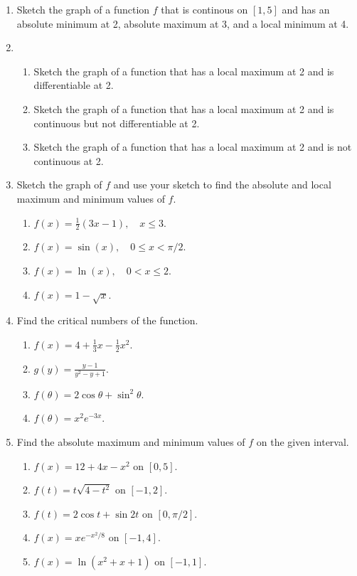 
\allhandoutinfo{}

\begin{enumerate}


	\item	Sketch the graph of a function $f$ that is continous on $[1,5]$ and has an absolute minimum at 2,
			absolute maximum at 3, and a local minimum at 4.

	\item 	\begin{enumerate}
			\item	Sketch the graph of a function that has a local maximum at 2 and is differentiable at 2.
			\item	Sketch the graph of a function that has a local maximum at 2 and is continuous but not differentiable at 2.
			\item	Sketch the graph of a function that has a local maximum at 2 and is not continuous at 2.
		\end{enumerate} 


	\item	Sketch the graph of $f$ and use your sketch to find the absolute and local maximum and minimum values of $f$.
		\begin{enumerate}
			\item	$\displaystyle f(x) = \frac{1}{2}(3x-1), \quad x \leq 3$.
			\item	$f(x) = \sin(x), \quad 0 \leq x < \pi/2$.
			\item	$f(x) = \ln(x), \quad 0<x \leq 2$.
			\item	$f(x) = 1 - \sqrt{x}$.
		\end{enumerate}

	\item	Find the critical numbers of the function.
		\begin{enumerate}
			\item	$\displaystyle f(x) = 4+ \frac{1}{3}x - \frac{1}{2}x^2$.
			\item	$\displaystyle g(y) = \frac{y-1}{ y^2 - y + 1 }$.
			\item	$f(\theta) = 2 \cos \theta + \sin^2 \theta$.
			\item	$f(\theta) = x^2 e^{-3x}$.
		\end{enumerate}

	\item	Find the absolute maximum and minimum values of $f$ on the given interval.
		\begin{enumerate}
			\item	$f(x) = 12+4x-x^2$ on $[0,5]$.
			\item	$f(t) = t \sqrt{4-t^2}$ on $[-1,2]$.
			\item	$f(t) = 2 \cos t + \sin 2t$ on $[0,\pi/2]$.
			\item	$f(x) = x e^{-x^2/8}$ on $[-1,4]$.
			\item	$f(x) = \ln(x^2+x+1)$ on $[-1,1]$.	
		\end{enumerate}



\end{enumerate} 



